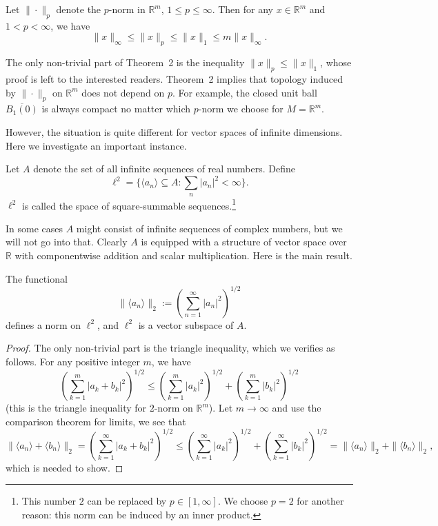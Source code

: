 \begin{thm}
  Let $\| \cdot \|_p$ denote the $p$-norm in $\mathbb{R}^m$, $1 \leqslant p \leqslant \infty$.
  Then for any $x \in \mathbb{R}^m$ and $1 < p < \infty$, we have
  \[
    \| x \|_\infty \leqslant \| x \|_p \leqslant \| x \|_1 \leqslant m \| x \|_\infty.
  \]
\end{thm}

The only non-trivial part of Theorem~2 is the inequality $\| x \|_p \leqslant \| x \|_1$, whose proof is left to the interested readers.
Theorem~2 implies that topology induced by $\| \cdot \|_p$ on $\mathbb{R}^m$ does not depend on $p$.
For example, the closed unit ball $\overline{B_1(0)}$ is always compact no matter which $p$-norm we choose for $M = \mathbb{R}^m$.

However, the situation is quite different for vector spaces of infinite dimensions.
Here we investigate an important instance.

\begin{defn}
  Let $A$ denote the set of all infinite sequences of real numbers.
  Define
  \[
    \ell^2 = \{ \langle a_n \rangle \subseteq A \colon \sum_n |a_n|^2 < \infty \}.
  \]
  $\ell^2$ is called the space of \textsf{square-summable} sequences.\footnote{This number $2$ can be replaced by $p \in [1, \infty]$.
  We choose $p=2$ for another reason: this norm can be induced by an inner product.}
\end{defn}

In some cases $A$ might consist of infinite sequences of complex numbers, but we will not go into that.
Clearly $A$ is equipped with a structure of vector space over $\mathbb{R}$ with componentwise addition and scalar multiplication.
Here is the main result.

\begin{thm}
  The functional
  \[
    \| \langle a_n \rangle \|_2 := \left( \sum_{n=1}^\infty |a_n|^2 \right)^{1/2}
  \]
  defines a norm on $\ell^2$, and $\ell^2$ is a vector subspace of $A$.
\end{thm}

\begin{proof}
  The only non-trivial part is the triangle inequality, which we verifies as follows.  For any positive integer $m$, we have
  \[
    \left( \sum_{k=1}^m |a_k + b_k|^2 \right)^{1/2} \leqslant
    \left( \sum_{k=1}^m |a_k|^2 \right)^{1/2} +
    \left( \sum_{k=1}^m |b_k|^2 \right)^{1/2}
  \]
  (this is the triangle inequality for $2$-norm on $\mathbb{R}^m$).
  Let $m \to \infty$ and use the comparison theorem for limits, we see that
  \[
    \| \langle a_n \rangle + \langle b_n \rangle \|_2 = 
    \left( \sum_{k=1}^\infty |a_k + b_k|^2 \right)^{1/2} \leqslant
    \left( \sum_{k=1}^\infty |a_k|^2 \right)^{1/2} +
    \left( \sum_{k=1}^\infty |b_k|^2 \right)^{1/2}
    = \| \langle a_n \rangle \|_2 + \| \langle b_n \rangle \|_2,
  \]
  which is needed to show.
\end{proof}

